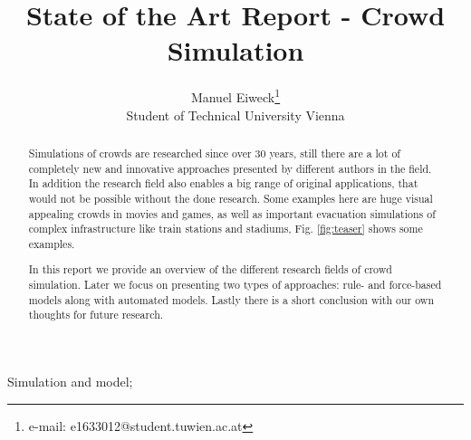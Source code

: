 \documentclass{acmsiggraph}               %
\title{State of the Art Report - Crowd Simulation}
\author{Manuel Eiweck\thanks{e-mail: e1633012@student.tuwien.ac.at}\\ Student of Technical University Vienna}
\begin{document}


\maketitle


\begin{abstract}
Simulations of crowds are researched since over 30 years, still there are a lot of completely new and innovative approaches presented by different authors in the field. In addition the research field also enables a big range of original applications, that would not be possible without the done research. Some examples here are huge visual appealing crowds in movies and games, as well as important evacuation simulations of complex infrastructure like train stations and stadiums, Fig. \ref{fig:teaser} shows some examples.

In this report we provide an overview of the different research fields of crowd simulation. Later we focus on presenting two types of approaches: rule- and force-based models along with automated models. Lastly there is a short conclusion with our own thoughts for future research.

\end{abstract}


\begin{CRcatlist}
{Simulation and model}{};
\end{CRcatlist}
\end{document}
